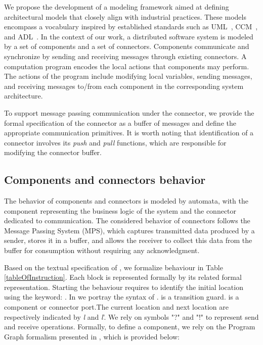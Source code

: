 We propose the development of a modeling framework aimed at defining architectural models that closely align with industrial practices. These models encompass a vocabulary inspired by established standards such as UML~\cite{UML2017}, CCM~\cite{CCM:OMG:08}, and ADL~\cite{AADL:SAE:09}. In the context of our work, a distributed software system is modeled by a set of components and a set of connectors. Components communicate and synchronize by sending and receiving messages through existing connectors. A computation program encodes the local actions that components may perform. The actions of the program include modifying local variables,
sending messages, and receiving messages to/from each component in the corresponding system architecture.

To support message passing communication under the connector, we provide the formal specification of the connector as a buffer of messages and define the appropriate communication primitives. It is worth noting that identification of a connector involves its \emph{push} and \emph{pull} functions, which are responsible for modifying the connector buffer.


\subsection{Components and connectors behavior}
The behavior of components and connectors is modeled by automata, with the component representing the business logic of the system and the connector dedicated to communication. The considered behavior of connectors follows the Message Passing System (MPS), which captures transmitted data produced by a sender, stores it in a buffer, and allows the receiver to collect this data from the buffer for consumption without requiring any acknowledgment. 

\noindent
\begin{figure}[!htb]
  
    \label{fig:cpc:grammar}
\end{figure} 
\normalsize

Based on the textual specification of \cpc, we formalize \cpc behaviour in Table \ref{tableOfInstruction}. Each \cpc block is represented formally by its related \cpc formal representation. Starting the behaviour requires to identify the initial location using the keyword:  . In  we portray the syntax of \cpc.  is a transition guard.  is a component or connector port.The current location and next location are respectively indicated by \emph{l} and \emph{l}'. We rely on symbols "?" and "!" to represent send and receive operations. Formally, to define a component, we rely on the Program Graph formalism presented in \cite{baierprinciples2008}, which is provided below:

